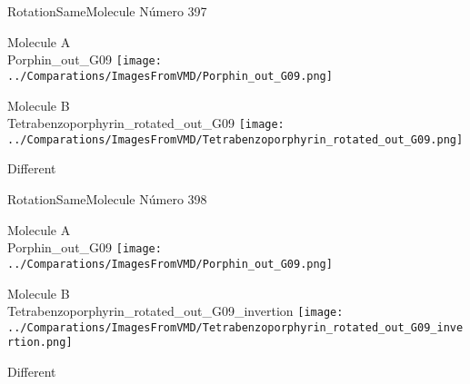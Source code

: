 \vtab[-2cm]
\begin{center}
{\large RotationSameMolecule \tab Número 397}
\end{center}
\begin{multicols}{2}
\begin{center}
Molecule A \\ 
Porphin\_out\_G09
\texttt{[image: ../Comparations/ImagesFromVMD/Porphin\_out\_G09.png]}
\\
\vtab

\columnbreak
Molecule B \\ 
Tetrabenzoporphyrin\_rotated\_out\_G09
\texttt{[image: ../Comparations/ImagesFromVMD/Tetrabenzoporphyrin\_rotated\_out\_G09.png]}
\\
\vtab


\end{center}
\end{multicols}
\begin{center}
\vtab
\vtab
\textcolor{NavyBlue}{\Large Different}
\end{center}

 \newpage

\vtab[-2cm]
\begin{center}
{\large RotationSameMolecule \tab Número 398}
\end{center}
\begin{multicols}{2}
\begin{center}
Molecule A \\ 
Porphin\_out\_G09
\texttt{[image: ../Comparations/ImagesFromVMD/Porphin\_out\_G09.png]}
\\
\vtab

\columnbreak
Molecule B \\ 
Tetrabenzoporphyrin\_rotated\_out\_G09\_invertion
\texttt{[image: ../Comparations/ImagesFromVMD/Tetrabenzoporphyrin\_rotated\_out\_G09\_invertion.png]}
\\
\vtab


\end{center}
\end{multicols}
\begin{center}
\vtab
\vtab
\textcolor{NavyBlue}{\Large Different}
\end{center}

 \newpage

